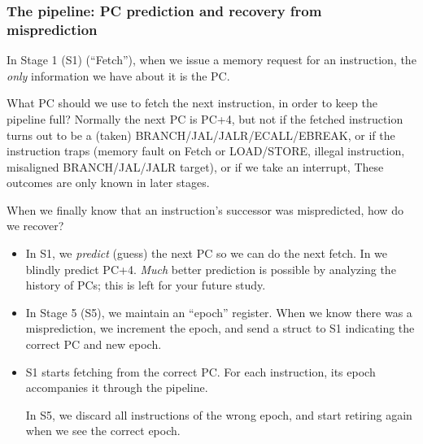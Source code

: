 \begin{frame}[fragile]
\frametitle{The {\FIFE} pipeline: PC prediction and recovery from misprediction}

\begin{center}\scriptsize
 \begin{minipage}[t]{0.48\textwidth}\scriptsize
  In Stage 1 (S1) (``Fetch''), when we issue a memory request for an
  instruction, the \emph{only} information we have about it is the PC.

  \vspace*{1ex}

  What PC should we use to fetch the next instruction, in order to
  keep the pipeline full?  Normally the next PC is PC+4, but not if
  the fetched instruction turns out to be a (taken)
  BRANCH/JAL/JALR/ECALL/EBREAK, or if the instruction traps (memory
  fault on Fetch or LOAD/STORE, illegal instruction, misaligned
  BRANCH/JAL/JALR target), or if we take an interrupt, {\etc} These
  outcomes are only known in later stages.

  \vspace*{1ex}

  When we finally know that an instruction's successor was
  mispredicted, how do we recover?

 \end{minipage}
 \hm
 \begin{minipage}[t]{0.48\textwidth}\scriptsize
  \begin{itemize}

    \item In S1, we \emph{predict} (guess) the next PC so we can do
      the next fetch. In {\FIFE} we blindly predict PC+4.  \emph{Much}
      better prediction is possible by analyzing the history of PCs;
      this is left for your future study.

    \vspace*{0.5ex}

    \item In Stage 5 (S5), we maintain an ``epoch'' register.  When we
      know there was a misprediction, we increment the epoch, and send
      a struct to S1 indicating the correct PC and new epoch.

    \vspace*{0.5ex}

    \item S1 starts fetching from the correct PC. For each
      instruction, its epoch accompanies it through the pipeline.

      In S5, we discard all instructions of the wrong epoch, and start
      retiring again when we see the correct epoch.


\end{itemize}
\end{minipage}
\end{center}
\end{frame}
